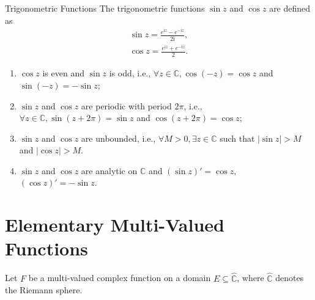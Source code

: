 \vspace{0.7cm}
\begin{definition}{Trigonometric Functions}
    The trigonometric functions \(\sin z\) and \(\cos z\) are defined as
    \begin{gather*}
        \sin z = \frac{e^{\mathrm{i} z} - e^{-\mathrm{i} z}}{2\mathrm{i}}, \\
        \cos z = \frac{e^{\mathrm{i} z} + e^{-\mathrm{i} z}}{2}.  
    \end{gather*}
\end{definition}

\begin{property}
    \begin{enumerate}
        \item \(\cos z\) is even and \(\sin z\) is odd, i.e., 
            \(\forall z \in \mathbb{C}, \cos(-z) = \cos z\) and \(\sin(-z) = -\sin z\);
        \item \(\sin z\) and \(\cos z\) are periodic with period \(2\pi\), i.e., 
            \(\forall z \in \mathbb{C}, \sin(z + 2\pi) = \sin z\) and \(\cos(z + 2\pi) = \cos z\);
        \item \(\sin z\) and \(\cos z\) are unbounded, i.e., 
            \(\forall M > 0, \exists z \in \mathbb{C}\) such that \(|\sin z| > M\) and \(|\cos z| > M\).
        \item \(\sin z\) and \(\cos z\) are analytic on \(\mathbb{C}\) and 
            \(\left( \sin z \right)' = \cos z\), \(\left( \cos z \right)' = -\sin z\).
    \end{enumerate}  
\end{property}

\section{Elementary Multi-Valued Functions} 
Let \(F\) be a multi-valued complex function on a domain \(E \subseteq \widehat{\mathbb{C}}\), 
where \(\widehat{\mathbb{C}}\) denotes the Riemann sphere.

